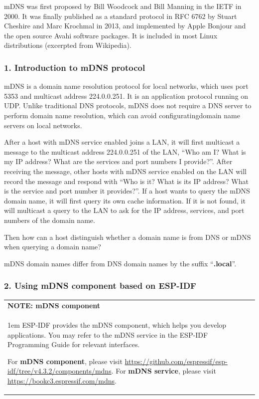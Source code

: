\documentclass[a4paper,12pt,openany]{book}
\newcommand{\note}[2][NOTE]{ %
\vspace{6pt}
\begin{tabular}{b{\textwidth}}
\hline
\fontfamily{phv}\selectfont \textbf{#1}\\
\leftskip 1em #2\\
\hline
\end{tabular}
}
\begin{document}
mDNS was first proposed by Bill Woodcock and Bill Manning in the IETF in 2000. It was finally published as a standard protocol in RFC 6762 by Stuart Cheshire and Marc Krochmal in 2013, and implemented by Apple Bonjour and the open source Avahi software packages. It is included in most Linux distributions (excerpted from Wikipedia).

\subsubsection{1. Introduction to mDNS protocol}
mDNS is a domain name resolution protocol for local networks, which uses port 5353 and multicast address 224.0.0.251. It is an application protocol running on UDP. Unlike traditional DNS protocols, mDNS does not require a DNS server to perform domain name resolution, which can avoid configuratingdomain name servers on local networks.

After a host with mDNS service enabled joins a LAN, it will first multicast a message to the multicast address 224.0.0.251 of the LAN, “Who am I? What is my IP address? What are the services and port numbers I provide?”. After receiving the message, other hosts with mDNS service enabled on the LAN will record the message and respond with “Who is it? What is its IP address? What is the service and port number it provides?”. If a host wants to query the mDNS domain name, it will first query its own cache information. If it is not found, it will multicast a query to the LAN to ask for the IP address, services, and port numbers of the domain name.

Then how can a host distinguish whether a domain name is from DNS or mDNS when querying a domain name?

mDNS domain names differ from DNS domain names by the suffix “\textbf{.local}”.

\subsubsection{2. Using mDNS component based on ESP-IDF}
\note[NOTE: mDNS component]{ESP-IDF provides the mDNS component, which helps you develop applications. You may refer to the mDNS service in the ESP-IDF Programming Guide for relevant interfaces.

For \textbf{mDNS component}, please visit \url{https://github.com/espressif/esp-idf/tree/v4.3.2/components/mdns}. For \textbf{mDNS service}, please visit \url{https://bookc3.espressif.com/mdns}.}
\end{document}

